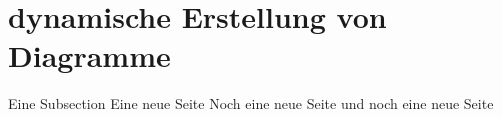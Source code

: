         
        
    \section{dynamische Erstellung von Diagramme}
        Eine Subsection
        \newpage
        Eine neue Seite
        \newpage 
        Noch eine neue Seite
        \newpage    
        und noch eine neue Seite